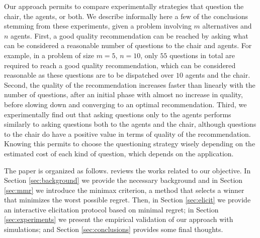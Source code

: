 \documentclass[sigconf, anonymous]{aamas}
\begin{document}
Our approach permits to compare experimentally strategies that question the chair, the agents, or both. We describe informally here a few of the conclusions stemming from these experiments, given a problem involving $m$ alternatives and $n$ agents. First, a good quality recommendation can be reached by asking what can be considered a reasonable number of questions to the chair and agents. For example, in a problem of size $m = 5$, $n = 10$, only $55$ questions in total are required to reach a good quality recommendation, which can be considered reasonable as these questions are to be dispatched over $10$ agents and the chair.
Second, the quality of the recommendation increases faster than linearly with the number of questions, 
after an initial phase with almost no increase in quality, before slowing down and converging to an optimal recommendation. %
Third, we experimentally find out that asking questions only to the agents performs similarly to asking questions both to the agents and the chair, although questions to the chair do have a positive value in terms of quality of the recommendation.
Knowing this permits to choose the questioning strategy wisely depending on the estimated cost of each kind of question, which depends on the application. 

The paper is organized as follows.  reviews the works related to our objective.
In Section \ref{sec:background} we provide the necessary background and in Section \ref{sec:mmr} we introduce the minimax criterion, a method that selects a winner that minimizes the worst possible regret.
Then, in Section \ref{sec:elicit} we provide an interactive elicitation protocol based on minimal regret;  in Section \ref{sec:experiments} we present the empirical validation of our approach with simulations; and Section \ref{sec:conclusions} provides some final thoughts.
\end{document}
